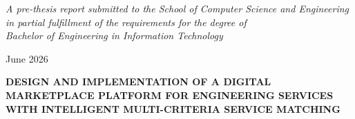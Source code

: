 \documentclass[12pt, twoside]{report}
\begin{document}
\begin{titlepage}
	\vspace{4.5cm}
	\textit{A pre-thesis report submitted to the School of Computer Science
		and Engineering \\ in partial fulfillment of the requirements for the
		degree of \\ Bachelor of Engineering in Information Technology}

	\vspace{4.5cm}
	 \par June 2026
														
	\newpage
													
	\centering
														
	\textbf{\large DESIGN AND IMPLEMENTATION OF A DIGITAL MARKETPLACE
		PLATFORM FOR ENGINEERING SERVICES WITH INTELLIGENT MULTI-CRITERIA
		SERVICE MATCHING}\par
	\vspace{4cm}
														
	\hspace{7cm}
	\par
	\vspace{2cm}
														
	\hspace{7cm}
	\makebox[7cm][l]{\underline{\hspace{7cm}}}
	\par \hspace{7cm}
	\par
	\vspace{2cm}
														
	\hspace{7cm}
	\makebox[7cm][l]{\underline{\hspace{7cm}}}
	\par \hspace{7cm}
	\par
	\vspace{2cm}
														
	\hspace{7cm}
	\makebox[7cm][l]{\underline{\hspace{7cm}}}
	\par \hspace{7cm}
	\par
	\vspace{2cm}
														
	\hspace{7cm}
	\makebox[7cm][l]{\underline{\hspace{7cm}}}
	\par \hspace{7cm}
	\par
	\vspace{2cm}
			

\end{titlepage}
\end{document}
